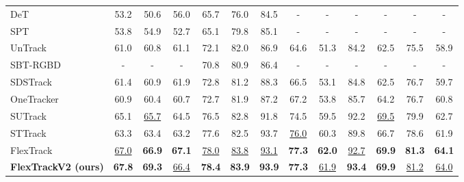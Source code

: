\begin{table}[t]
\begin{tabular}{l|ccc|ccc|cc|cc|cc}
DeT~\cite{depthtrack}
& 53.2 & 50.6 & 56.0 & 65.7 & 76.0 & 84.5 &  -   &  -   &  -   &  -   &  -   &  -   \\
SPT~\cite{rgbd1k}
& 53.8 & 54.9 & 52.7 & 65.1 & 79.8 & 85.1 &  -   &  -   &  -   &  -   &  -   &  -   \\
UnTrack~\cite{untrack} 
& 61.0 & 60.8 & 61.1 & 72.1 & 82.0 & 86.9 & 64.6 & 51.3 & 84.2 & 62.5 & 75.5 & 58.9\\
SBT-RGBD~\cite{sbt}
&  -   &  -   &  -   & 70.8 & 80.9 & 86.4 &  -   &  -   &  -   &  -   &  -   &  -   \\
SDSTrack~\cite{hou2024sdstrack} 
& 61.4 & 60.9 & 61.9 & 72.8 & 81.2 & 88.3 & 66.5 & 53.1 & 84.8 & 62.5 & 76.7 & 59.7\\
OneTracker~\cite{hong2024onetracker} 
& 60.9 & 60.4 & 60.7 & 72.7 & 81.9 & 87.2 & 67.2 & 53.8 & 85.7 & 64.2 & 76.7 & 60.8\\
SUTrack~\cite{chen2024sutrack} 
& 65.1 & \underline{65.7} & 64.5 & 76.5 & 82.8 & 91.8 & 74.5 & 59.5 & 92.2 & \underline{69.5} & 79.9 & 62.7\\
STTrack~\cite{sttrack} 
& 63.3 & 63.4 & 63.2 & 77.6 & 82.5 & 93.7 & \underline{76.0} & 60.3 & 89.8 & 66.7 & 78.6 & 61.9\\
FlexTrack 
& \underline{67.0} & \textbf{66.9} & \textbf{67.1} & \underline{78.0} & \underline{83.8} & \underline{93.1} & \textbf{77.3} & \textbf{62.0} & \underline{92.7} & \textbf{69.9} & \textbf{81.3} & \textbf{64.1}\\

\midrule

\textbf{FlexTrackV2 (ours)}
& \textbf{67.8} & \textbf{69.3} & \underline{66.4} & \textbf{78.4}  & \textbf{83.9}  & \textbf{93.9} & \textbf{77.3} & \underline{61.9} & \textbf{93.4} & \textbf{69.9} & \underline{81.2} & \underline{64.0}\\

\bottomrule
\end{tabular}
\end{table}





